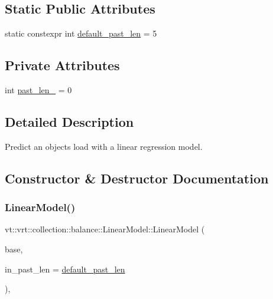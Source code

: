 \subsection*{Static Public Attributes}
\begin{DoxyCompactItemize}
\item 
static constexpr int \hyperlink{structvt_1_1vrt_1_1collection_1_1balance_1_1_linear_model_a17d295e933227905ba94ea69f1cbfb64}{default\+\_\+past\+\_\+len} = 5
\end{DoxyCompactItemize}
\subsection*{Private Attributes}
\begin{DoxyCompactItemize}
\item 
int \hyperlink{structvt_1_1vrt_1_1collection_1_1balance_1_1_linear_model_a1fb9ade3b0967df8c59770d53d0b8f97}{past\+\_\+len\+\_\+} = 0
\end{DoxyCompactItemize}


\subsection{Detailed Description}
Predict an object\textquotesingle{}s load with a linear regression model. 

\subsection{Constructor \& Destructor Documentation}
\mbox{\label{structvt_1_1vrt_1_1collection_1_1balance_1_1_linear_model_a5635a178ad9efde93b96d5f44e849175}} 
\subsubsection{\texorpdfstring{Linear\+Model()}{LinearModel()}}
{\footnotesize\ttfamily vt\+::vrt\+::collection\+::balance\+::\+Linear\+Model\+::\+Linear\+Model (\begin{DoxyParamCaption}\item[{std\+::shared\+\_\+ptr$<$ \hyperlink{classvt_1_1vrt_1_1collection_1_1balance_1_1_load_model}{balance\+::\+Load\+Model} $>$}]{base,  }\item[{int}]{in\+\_\+past\+\_\+len = {\ttfamily \hyperlink{structvt_1_1vrt_1_1collection_1_1balance_1_1_linear_model_a17d295e933227905ba94ea69f1cbfb64}{default\+\_\+past\+\_\+len}} }\end{DoxyParamCaption})\hspace{0.3cm}{\ttfamily [inline]}, {\ttfamily [explicit]}}




